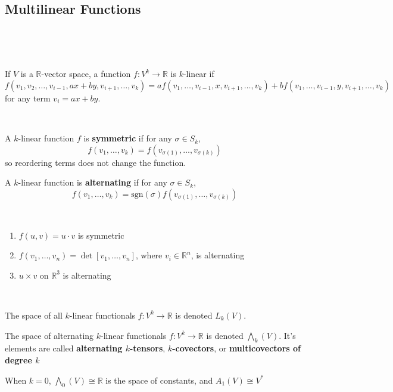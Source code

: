 \documentclass{article}
\begin{document}
\subsection{Multilinear Functions}
\

\begin{definition}
  \

  If $V$ is a $\mathbb{R}$-vector space, a function $f: V^k \to \mathbb{R}$ is $k$-linear if $$f(v_1, v_2, \dots, v_{i-1}, ax + by, v_{i+1}, \dots, v_k) = af(v_1, \dots, v_{i-1}, x, v_{i+1}, \dots, v_k) + bf(v_1, \dots, v_{i-1}, y, v_{i+1}, \dots, v_k)$$for any term $v_i = ax + by$.
\end{definition}

\begin{definition}
  \

  A $k$-linear function $f$ is \textbf{symmetric} if for any $\sigma \in S_k$, $$f(v_1, \dots, v_k) = f(v_{\sigma(1)}, \dots, v_{\sigma(k)})$$so reordering terms does not change the function.

  A $k$-linear function is \textbf{alternating} if for any $\sigma \in S_k$, $$f(v_1, \dots, v_k) = \text{sgn}(\sigma)f(v_{\sigma(1)}, \dots, v_{\sigma(k)})$$
\end{definition}

\begin{example}
  \

  \begin{enumerate}
    \item $f(u,v) = u \cdot v$ is symmetric
    \item $f(v_1, \dots, v_n) = \det[v_1, \dots, v_n]$, where $v_i \in \mathbb{R}^n$, is alternating
    \item $u \times v$ on $\mathbb{R}^3$ is alternating
  \end{enumerate}
\end{example}

\begin{definition}
  \

  The space of all $k$-linear functionals $f:V^k \to \mathbb{R}$ is denoted $L_k(V)$.

  The space of alternating $k$-linear functionals $f: V^k \to \mathbb{R}$ is denoted $\bigwedge_k(V)$. It's elements are called \textbf{alternating $k$-tensors}, \textbf{$k$-covectors}, or \textbf{multicovectors of degree $k$}

  When $k = 0$, $\bigwedge_0(V) \cong \mathbb{R}$ is the space of constants, and $A_1(V) \cong V^*$
\end{definition}
\end{document}
